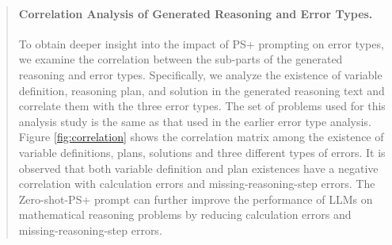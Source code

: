 \documentclass[11pt]{article}
\begin{document}
\begin{abstract}
\paragraph{Correlation Analysis of Generated Reasoning and Error Types.}
To obtain deeper insight into the impact of PS+ prompting on error types, we examine the correlation between the sub-parts of the generated reasoning and error types. Specifically, we analyze the existence of variable definition, reasoning plan, and solution in the generated reasoning text and correlate them with the three error types.  The set of problems used for this analysis study is the same as that used in the earlier error type analysis. 
Figure \ref{fig:correlation} shows the correlation matrix among the existence of variable definitions, plans, solutions and three different types of errors. It is observed that both variable definition and plan existences have a negative correlation with calculation errors and missing-reasoning-step errors. The Zero-shot-PS+ prompt can further improve the performance of LLMs on mathematical reasoning problems by reducing calculation errors and missing-reasoning-step errors.


\end{abstract}
\end{document}
